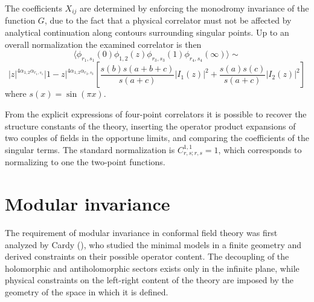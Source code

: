 \documentclass[a4paper,12pt]{report}
\begin{document}
The coefficients $X_{ij}$ are determined by enforcing the monodromy invariance of the function $G$, due to the
fact that a physical correlator must not be affected by analytical continuation along contours surrounding
singular points. Up to an overall normalization the examined correlator is then
\begin{equation}
\langle\phi_{r_{1},s_{1}}(0)\phi_{1,2}(z)\phi_{r_{3},s_{3}}(1)\phi_{r_{4},s_{4}}(\infty)\rangle\sim
\end{equation}
\begin{displaymath}
|z|^{4\alpha_{1,2}\alpha_{r_{1},s_{1}}}|1-z|^{4\alpha_{1,2}\alpha_{r_{3},s_{3}}}\left[\frac{s(b)s(a+b+c)}{s(a+c)}|I_{1}(z)|^{2}+\frac{s(a)s(c)}{s(a+c)}|I_{2}(z)|^{2}\right]
\end{displaymath}
where $s(x)=\sin(\pi x)$.

\vspace{0.5cm}

From the explicit expressions of four-point correlators it is possible to recover the structure constants of the
theory, inserting the operator product expansions of two couples of fields in the opportune limits, and comparing
the coefficients of the singular terms. The standard normalization is $C_{r,s;r,s}^{1,1}=1$, which corresponds to
normalizing to one the two-point functions.

\vspace{1cm}

\section{Modular invariance}

The requirement of modular invariance in conformal field theory was first analyzed by Cardy (\cite{cardymod}), who
studied the minimal models in a finite geometry and derived constraints on their possible operator content. The
decoupling of the holomorphic and antiholomorphic sectors exists only in the infinite plane, while physical
constraints on the left-right content of the theory are imposed by the geometry of the space in which it is
defined.
\end{document}
